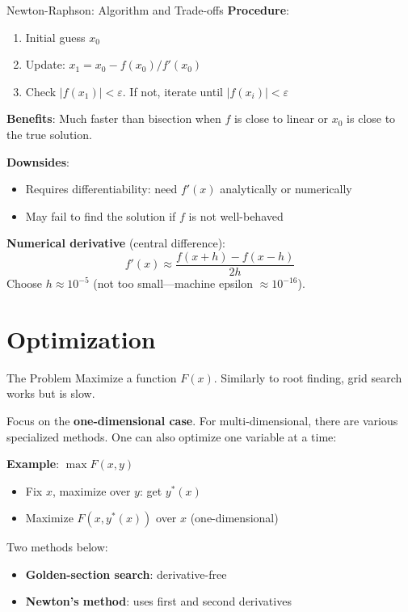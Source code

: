 \documentclass[blue]{beamer}
\begin{document}
\begin{frame}{Newton-Raphson: Algorithm and Trade-offs}
\textbf{Procedure}:
\vspace{-6pt}
\begin{enumerate}
	\item Initial guess $x_0$
	\item Update: $x_1 = x_0 - f(x_0)/f'(x_0)$
	\item Check $|f(x_1)| < \varepsilon$. If not, iterate until $|f(x_i)| < \varepsilon$
\end{enumerate}
\textbf{Benefits}: Much faster than bisection when $f$ is close to linear or $x_0$ is close to the true solution.

\textbf{Downsides}:
\vspace{-6pt}
\begin{itemize}
	\item Requires differentiability: need $f'(x)$ analytically or numerically
	\item May fail to find the solution if $f$ is not well-behaved
\end{itemize}
\textbf{Numerical derivative} (central difference):
\[
f'(x) \approx \frac{f(x+h) - f(x-h)}{2h}
\]
Choose $h \approx 10^{-5}$ (not too small---machine epsilon $\approx 10^{-16}$).
\end{frame}

\section{Optimization}

\begin{frame}{The Problem}
	Maximize a function $F(x)$. Similarly to root finding, grid search works but is slow.
	
	\bigskip
	Focus on the \textbf{one-dimensional case}. For multi-dimensional, there are various specialized methods. One can also optimize one variable at a time:
	
	\textbf{Example}: $\max F(x, y)$
	\begin{itemize}
		\item Fix $x$, maximize over $y$: get $y^*(x)$
		\item Maximize $F(x, y^*(x))$ over $x$ (one-dimensional)
	\end{itemize}
	
	\bigskip
	Two methods below:
	\begin{itemize}
		\item \textbf{Golden-section search}: derivative-free
		\item \textbf{Newton's method}: uses first and second derivatives
	\end{itemize}
\end{frame}
\end{document}
